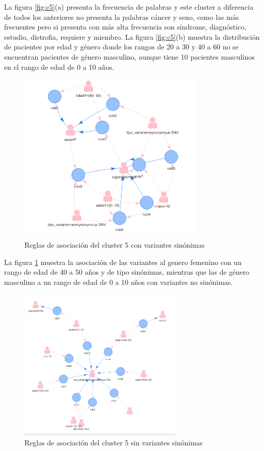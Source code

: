 La figura \ref{fig:c5}(a) presenta la frecuencia de palabras y este cluster a diferencia de todos los anteriores no presenta la palabras cáncer y seno, como las más frecuentes pero si presenta con más alta frecuencia son síndrome, diagnóstico, estudio, distrofia, requiere y miembro. La figura \ref{fig:c5}(b) muestra la distribución de pacientes por edad y género donde los rangos de 20 a 30 y 40 a 60 no se encuentran pacientes de género masculino, aunque tiene 10 pacientes masculinos en el rango de edad de 0 a 10 años.

\begin{figure}[H]
	\centering
	\includegraphics[width=0.8\textwidth]{Kap4/reglas5_1}
	\caption{Reglas de asociación del cluster 5 con variantes sinónimas} \label{fig:r5}
\end{figure}

La figura \ref{fig:r5} muestra la asociación de las variantes al genero femenino con un rango de edad de 40 a 50 años y de tipo sinónimas, mientras que las de género masculino  a un rango de edad de 0 a 10 años con variantes no sinónimas.

\begin{figure}[H]
	\centering
	\includegraphics[width=0.7\textwidth]{Kap4/reglas5_2}
	\caption{Reglas de asociación del cluster 5 sin variantes sinónimas} \label{fig:re5}
\end{figure}

